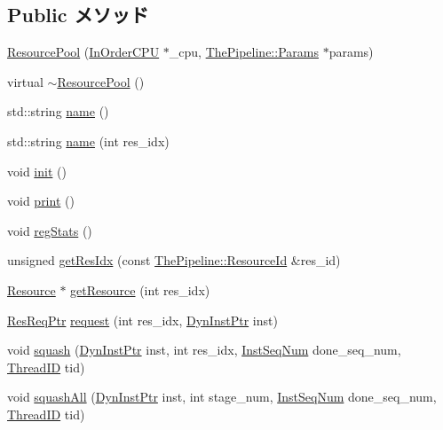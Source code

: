 \subsection*{Public メソッド}
\begin{DoxyCompactItemize}
\item 
\hyperlink{classResourcePool_a765bddb90f804d1ddebbc19b3459bb2e}{ResourcePool} (\hyperlink{classInOrderCPU}{InOrderCPU} $\ast$\_\-cpu, \hyperlink{namespaceThePipeline_ab62ca16eeca26566ad2422b5df4943ce}{ThePipeline::Params} $\ast$params)
\item 
virtual \hyperlink{classResourcePool_acba0a0d37ec0b89303d390cdb9e372cf}{$\sim$ResourcePool} ()
\item 
std::string \hyperlink{classResourcePool_aa62b508d2c0e7d9cec12924965276eb5}{name} ()
\item 
std::string \hyperlink{classResourcePool_ac28b6ddca5d1abd76095cffee93aa164}{name} (int res\_\-idx)
\item 
void \hyperlink{classResourcePool_a02fd73d861ef2e4aabb38c0c9ff82947}{init} ()
\item 
void \hyperlink{classResourcePool_a388f572c62279f839ee138a9afbdeeb5}{print} ()
\item 
void \hyperlink{classResourcePool_a4dc637449366fcdfc4e764cdf12d9b11}{regStats} ()
\item 
unsigned \hyperlink{classResourcePool_aa590916e201f046ca64fa621f9e3dc0c}{getResIdx} (const \hyperlink{namespaceThePipeline_a2a7d8e086edbca0402639d3b6b835286}{ThePipeline::ResourceId} \&res\_\-id)
\item 
\hyperlink{classResource}{Resource} $\ast$ \hyperlink{classResourcePool_a70b29b3de5f1fcf1d1a666dd5303250a}{getResource} (int res\_\-idx)
\item 
\hyperlink{classResourceRequest}{ResReqPtr} \hyperlink{classResourcePool_a75ce2cd367c200399a9fd0839d951124}{request} (int res\_\-idx, \hyperlink{classRefCountingPtr}{DynInstPtr} inst)
\item 
void \hyperlink{classResourcePool_a1e6b072b1524df996c37c65f032c0c5e}{squash} (\hyperlink{classRefCountingPtr}{DynInstPtr} inst, int res\_\-idx, \hyperlink{inst__seq_8hh_a258d93d98edaedee089435c19ea2ea2e}{InstSeqNum} done\_\-seq\_\-num, \hyperlink{base_2types_8hh_ab39b1a4f9dad884694c7a74ed69e6a6b}{ThreadID} tid)
\item 
void \hyperlink{classResourcePool_a58b8c9f76e422935e05267f75493d722}{squashAll} (\hyperlink{classRefCountingPtr}{DynInstPtr} inst, int stage\_\-num, \hyperlink{inst__seq_8hh_a258d93d98edaedee089435c19ea2ea2e}{InstSeqNum} done\_\-seq\_\-num, \hyperlink{base_2types_8hh_ab39b1a4f9dad884694c7a74ed69e6a6b}{ThreadID} tid)

\end{DoxyCompactItemize}
